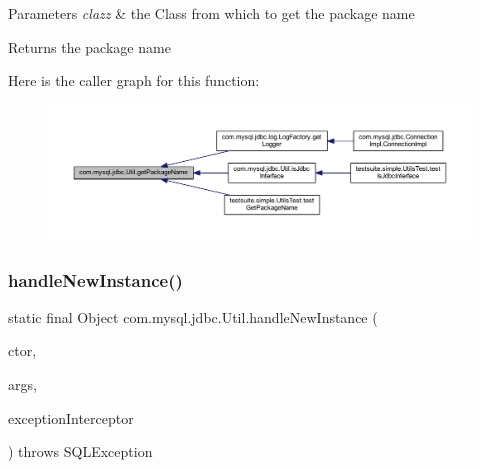 \begin{DoxyParams}{Parameters}
{\em clazz} & the Class from which to get the package name \\
\hline
\end{DoxyParams}
\begin{DoxyReturn}{Returns}
the package name 
\end{DoxyReturn}
Here is the caller graph for this function\+:
\nopagebreak
\begin{figure}[H]
\begin{center}
\leavevmode
\includegraphics[width=350pt]{classcom_1_1mysql_1_1jdbc_1_1_util_a30a2020999202ce3bb0871498f6bcc5b_icgraph}
\end{center}
\end{figure}
\mbox{\label{classcom_1_1mysql_1_1jdbc_1_1_util_ae60ce70ba2e8e536e773f4abab83c4c1}} 
\subsubsection{\texorpdfstring{handle\+New\+Instance()}{handleNewInstance()}}
{\footnotesize\ttfamily static final Object com.\+mysql.\+jdbc.\+Util.\+handle\+New\+Instance (\begin{DoxyParamCaption}\item[{Constructor$<$?$>$}]{ctor,  }\item[{Object \mbox{[}$\,$\mbox{]}}]{args,  }\item[{\mbox{\hyperlink{interfacecom_1_1mysql_1_1jdbc_1_1_exception_interceptor}{Exception\+Interceptor}}}]{exception\+Interceptor }\end{DoxyParamCaption}) throws S\+Q\+L\+Exception\hspace{0.3cm}{\ttfamily [static]}}

